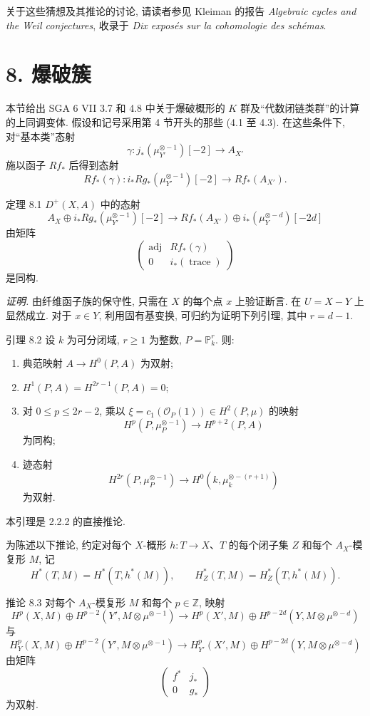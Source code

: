 关于这些猜想及其推论的讨论, 请读者参见 Kleiman 的报告 \emph{Algebraic cycles and the Weil conjectures}, 收录于 \emph{Dix exposés sur la cohomologie des schémas}.

\section*{8. 爆破簇}

本节给出 SGA 6 VII 3.7 和 4.8 中关于爆破概形的 $K$ 群及“代数闭链类群”的计算的上同调变体. 假设和记号采用第 4 节开头的那些 (4.1 至 4.3). 在这些条件下, 对“基本类”态射
\[
\gamma:j_*(\mu_{Y'}^{\otimes -1})[-2]\to A_{X'}
\]
施以函子 $Rf_*$ 后得到态射
\[
Rf_*(\gamma):i_*Rg_*(\mu_{Y'}^{\otimes -1})[-2]\to Rf_*(A_{X'}).
\]

\begin{statement}{定理 8.1}
$D^+(X,A)$ 中的态射
\[
A_X\oplus i_*Rg_*(\mu_{Y'}^{\otimes -1})[-2]\to
Rf_*(A_{X'})\oplus i_*(\mu_Y^{\otimes -d})[-2d]
\tag{8.1.1}
\]
由矩阵
\[
\begin{pmatrix}
\operatorname{adj}&Rf_*(\gamma)\\
0&i_*(\operatorname{trace})
\end{pmatrix}
\]
是同构.
\end{statement}

\emph{证明.} 由纤维函子族的保守性, 只需在 $X$ 的每个点 $x$ 上验证断言. 在 $U=X-Y$ 上显然成立. 对于 $x\in Y$, 利用固有基变换, 可归约为证明下列引理, 其中 $r=d-1$.

\begin{statement}{引理 8.2}
设 $k$ 为可分闭域, $r\ge1$ 为整数, $P=\mathbb P_k^r$. 则:
\begin{enumerate}[label=\alph*)]
\item 典范映射 $A\to H^0(P,A)$ 为双射;
\item $H^1(P,A)=H^{2r-1}(P,A)=0$;
\item 对 $0\le p\le2r-2$, 乘以 $\xi=c_1(\mathcal O_P(1))\in H^2(P,\mu)$ 的映射
\[
H^p(P,\mu_P^{\otimes -1})\to H^{p+2}(P,A)
\]
为同构;
\item 迹态射
\[
H^{2r}(P,\mu_P^{\otimes -1})\to H^0(k,\mu_k^{\otimes -(r+1)})
\]
为双射.
\end{enumerate}
\end{statement}

本引理是 2.2.2 的直接推论.

为陈述以下推论, 约定对每个 $X$-概形 $h:T\to X$、$T$ 的每个闭子集 $Z$ 和每个 $A_X$-模复形 $M$, 记
\[
H^*(T,M)=H^*(T,h^*(M)),\qquad
H^*_Z(T,M)=H^*_Z(T,h^*(M)).
\]

\begin{statement}{推论 8.3}
对每个 $A_X$-模复形 $M$ 和每个 $p\in\mathbb Z$, 映射
\[
H^p(X,M)\oplus H^{p-2}(Y',M\otimes\mu^{\otimes -1})
\to
H^p(X',M)\oplus H^{p-2d}(Y,M\otimes\mu^{\otimes -d})
\tag{8.3.1}
\]
与
\[
H_Y^p(X,M)\oplus H^{p-2}(Y',M\otimes\mu^{\otimes -1})
\to
H_{Y'}^p(X',M)\oplus H^{p-2d}(Y,M\otimes\mu^{\otimes -d})
\tag{8.3.2}
\]
由矩阵
\[
\begin{pmatrix}
f^*&j_*\\
0&g_*
\end{pmatrix}
\]
为双射.
\end{statement}

